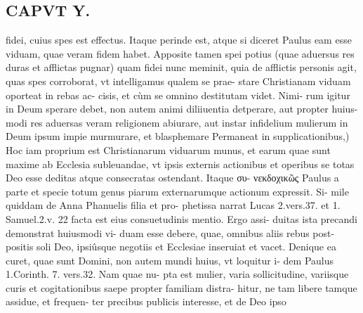 \documentclass{article}
\begin{document}
\begin{pages}
\section*{CAPVT  Y. }
\marginpar{[ p.29 ]}\pstart fidei, cuius spes est effectus. Itaque perinde est, atque  si diceret Paulus eam esse viduam, quae veram fidem habet. Apposite tamen spei potius (quae aduersus res duras et afflictas pugnar) quam fidei nunc meminit, quia de afflictis personis agit, quas spes corroborat, vt intelligamus qualem se prae- stare Christianam viduam oporteat in rebas ac- cisis, et cùm se omnino destitutam videt. Nimi- rum igitur in Deum sperare debet, non autem animi diliiuentia detperare, aut propter huius- modi res aduersas veram religionem abiurare, aut instar infidelium mulierum in Deum ipsum impie murmurare, et blasphemare  \pend\pstart Permaneat in supplicationibus,) Hoc iam proprium est Christianarum viduarum munus, et earum quae sunt maxime ab Ecclesia subleuandae, vt ipsis externis actionibus et operibus se totas Deo esse deditas atque consecratas ostendant. Itaque συ- νεκδοχικῶς Paulus a parte et specie totum genus piarum externarumque actionum expressit. Si- mile quiddam de Anna Phanuelis filia et pro- phetissa narrat Lucas 2.vers.37. et 1. Samuel.2.v. 22 facta est eius consuetudinis mentio. Ergo assi- duitas ista precandi demonstrat huiusmodi vi- duam esse debere, quae, omnibus aliis rebus post- positis soli Deo, ipsiûsque negotiis et Ecclesiae inseruiat et vacet. Denique ea curet, quae sunt Domini, non autem mundi huius, vt loquitur i- dem Paulus 1.Corinth. 7. vers.32. Nam quae nu- pta est mulier, varia sollicitudine, variisque curis et cogitationibus saepe propter familiam distra- hitur, ne tam libere tamque assidue, et frequen- ter precibus publicis interesse, et de Deo ipso  \pend

\end{pages}
\end{document}
